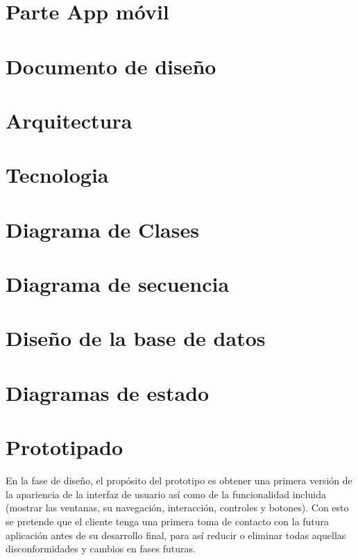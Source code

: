 \documentclass[../pfc.tex]{subfiles}
\begin{document}
	
	
	\section{Parte App móvil}
	
	\section{Documento de diseño}
	
	\section{Arquitectura}
	
	\section{Tecnologia}
	
	\section{Diagrama de Clases}
	
	\section{Diagrama de secuencia}
	
	\section{Diseño de la base de datos}
	
	\section{Diagramas de estado}
	
	\section{Prototipado}
	
	En la fase de diseño, el propósito del prototipo es obtener una primera versión de la apariencia de la interfaz de usuario así como de la funcionalidad incluida (mostrar las ventanas, su navegación, interacción, controles y botones). Con esto se pretende que el cliente tenga una primera toma de contacto con la futura aplicación antes de su desarrollo final, para así reducir o eliminar todas aquellas disconformidades y cambios en fases futuras.
	
\end{document}
